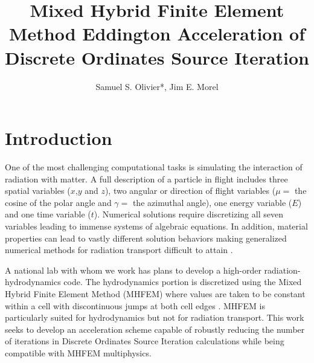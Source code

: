 \documentclass{anstrans}
\title{Mixed Hybrid Finite Element Method Eddington Acceleration of Discrete Ordinates Source Iteration}
\author{Samuel S. Olivier*, Jim E. Morel}
\institute{Department of Nuclear Engineering, Texas A\&M University, College Station, TX 77843}
\begin{document}
\section{Introduction} 
	One of the most challenging computational tasks is simulating the interaction of radiation with matter. 
	A full description of a particle in flight includes three spatial variables ($x$,$y$ and $z$), two angular or direction of flight variables ($\mu =$ the cosine of the polar angle and $\gamma =$ the azimuthal angle), one energy variable ($E$) and one time variable ($t$). Numerical solutions require discretizing all seven variables leading to immense systems of algebraic equations. In addition, material properties can lead to vastly different solution behaviors making generalized numerical methods for radiation transport difficult to attain \cite{adams}. 



	A national lab with whom we work has plans to develop a high-order radiation-hydrodynamics code. The hydrodynamics portion is discretized using the Mixed Hybrid Finite Element Method (MHFEM) where values are taken to be constant within a cell with discontinuous jumps at both cell edges \cite{mhfem}. MHFEM is particularly suited for hydrodynamics but not for radiation transport. This work seeks to develop an acceleration scheme capable of robustly reducing the number of iterations in Discrete Ordinates Source Iteration calculations while being compatible with MHFEM multiphysics.   
\end{document}
